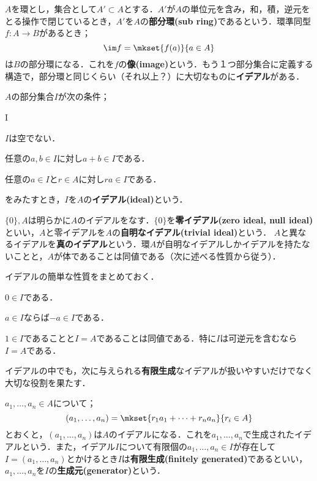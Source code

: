 $A$を環とし，集合として$A'\subset A$とする．$A'$が$A$の単位元を含み，和，積，逆元をとる操作で閉じているとき，$A'$を$A$の\textbf{部分環(sub ring)}であるという．環準同型$f:A\to B$があるとき；
\[\im f=\mkset{f(a)}{a\in A}\]
は$B$の部分環になる．これを$f$の\textbf{像(image)}という．もう１つ部分集合に定義する構造で，部分環と同じくらい（それ以上？）に大切なものに\textbf{イデアル}がある．

\begin{defi}[イデアル]
	$A$の部分集合$I$が次の条件；
	\begin{defiterm}{I}
		\item $I$は空でない．
		\item 任意の$a,b\in I$に対し$a+b\in I$である．
		\item 任意の$a\in I$と$r\in A$に対し$ra\in I$である．
	\end{defiterm}
	をみたすとき，$I$を$A$の\textbf{イデアル(ideal)}という．
\end{defi}

$\{0\},A$は明らかに$A$のイデアルをなす．$\{0\}$を\textbf{零イデアル(zero ideal, null ideal)}といい，$A$と零イデアルを$A$の\textbf{自明なイデアル(trivial ideal)}という． $A$と異なるイデアルを\textbf{真のイデアル}という．環$A$が自明なイデアルしかイデアルを持たないことと，$A$が体であることは同値である（次に述べる性質から従う）．

イデアルの簡単な性質をまとめておく．
\begin{sakura}
	\item $0\in I$である．
	\item $a\in I$ならば$-a\in I$である．
	\item $1\in I$であることと$I=A$であることは同値である．特に$I$は可逆元を含むなら$I=A$である．
\end{sakura}

イデアルの中でも，次に与えられる\textbf{有限生成}なイデアルが扱いやすいだけでなく大切な役割を果たす．

\begin{defi}[有限生成イデアル]
	$a_1,\dots,a_n\in A$について；
	\[(a_1,\dots,a_n)=\mkset{r_1a_1+\dots+r_na_n}{r_i\in A}\]
	とおくと，$(a_1,\dots,a_n)$は$A$のイデアルになる．これを$a_1,\dots,a_n$で生成されたイデアルという．また，イデアル$I$について有限個の$a_1,\dots,a_n\in I$が存在して$I=(a_1,\dots,a_n)$とかけるとき$I$は\textbf{有限生成(finitely generated)}であるといい，$a_1,\dots,a_n$を$I$の\textbf{生成元(generator)}という．
\end{defi}

